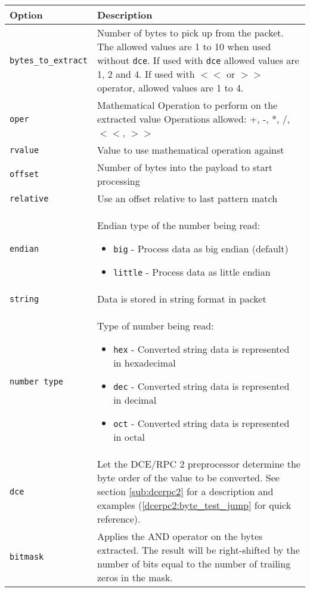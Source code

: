 \documentclass[english]{report}
\begin{document}
\begin{tabular}{| l | p{4.5in} |}
\hline
{\bf Option} & {\bf Description}\\
\hline
\hline
\texttt{bytes\_to\_extract} &

Number of bytes to pick up from the packet. The allowed values are 1 to 10 when
used without \texttt{dce}. If used with \texttt{dce} allowed values are 1, 2 and 4.
If used with $<<$ or $>>$ operator, allowed values are 1 to 4.\\

\hline
\texttt{oper} & Mathematical Operation to perform on the extracted value
Operations allowed: +, -, *, /, $<<$, $>>$\\
\hline
\texttt{rvalue} & Value to use mathematical operation against\\
\hline
\texttt{offset} & Number of bytes into the payload to start processing\\
\hline
\texttt{relative} & Use an offset relative to last pattern match\\
\hline
\texttt{endian} & Endian type of the number being read:
\begin{itemize}
\item \texttt{big} - Process data as big endian (default)
\item \texttt{little} - Process data as little endian
\end{itemize}\\
\hline
\texttt{string} & Data is stored in string format in packet\\
\hline
\texttt{number type} & Type of number being read:
\begin{itemize}
\item \texttt{hex} - Converted string data is represented in hexadecimal
\item \texttt{dec} - Converted string data is represented in decimal
\item \texttt{oct} - Converted string data is represented in octal
\end{itemize}\\
\hline
\texttt{dce} &

Let the DCE/RPC 2 preprocessor determine the byte order of the value to be
converted.  See section \ref{sub:dcerpc2} for a description and examples
(\ref{dcerpc2:byte_test_jump} for quick reference).\\

\hline
\texttt{bitmask} &
Applies the AND operator on the bytes extracted. The result will be
right-shifted by the number of bits equal to the number of trailing zeros
in the mask.\\
\hline
\end{tabular}
\end{document}
